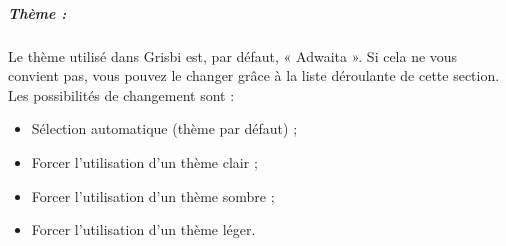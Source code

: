 %
%
%
%
%
%
%
%

\subparagraph{Thème :\label{setup-display-logo-theme}}

Le thème utilisé dans Grisbi est, par défaut, « Adwaita ». Si cela ne vous convient pas, vous pouvez le changer grâce à la liste déroulante de cette section. Les possibilités de changement sont :

\begin{itemize}
	\item Sélection automatique (thème par défaut) ;
	\item Forcer l'utilisation d'un thème clair ;
	\item Forcer l'utilisation d'un thème sombre ;	
	\item Forcer l'utilisation d'un thème léger.
\end{itemize}



